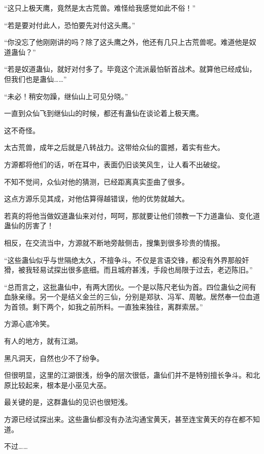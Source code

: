 
\begin{this_body}



“这只上极天鹰，竟然是太古荒兽。难怪给我感觉如此不俗！”

“若是要对付此人，恐怕要先对付这头鹰。”

“你没忘了他刚刚讲的吗？除了这头鹰之外，他还有几只上古荒兽呢。难道他是奴道蛊仙？”

“若是奴道蛊仙，就好对付多了。毕竟这个流派最怕斩首战术。就算他已经成仙，但我们也是蛊仙……”

“未必！稍安勿躁，继仙山上可见分晓。”

一直到众仙飞到继仙山的时候，都还有蛊仙在谈论着上极天鹰。

这不奇怪。

太古荒兽，成年之后就是八转战力。这带给众仙的震撼，着实有些大。

方源都将他们的话，听在耳中，表面仍旧谈笑风生，让人看不出破绽。

不知不觉间，众仙对他的猜测，已经距离真实歪曲了很多。

这点方源乐见其成，对他估算得越错误，他的优势就越大。

若真的将他当做奴道蛊仙来对付，呵呵，那就要让他们领教一下力道蛊仙、变化道蛊仙的厉害了！

相反，在交流当中，方源就不断地旁敲侧击，搜集到很多珍贵的情报。

“这些蛊仙似乎与世隔绝太久，不擅争斗。不仅是言语交锋，都没有外界那般奸猾，被我轻易试探出很多底细。而且城府甚浅，手段也局限于过去，老迈陈旧。”

“总而言之，这批蛊仙中，有两大团伙。一个是以陈尺老仙为首。四位蛊仙之间有血脉亲缘。另一个是结义金兰的三仙，分别是郑驮、冯军、周敏。居然奉一位血道为首领。剩下两个，如我之前所料。一直独来独往，离群索居。”

方源心底冷笑。

有人的地方，就有江湖。

黑凡洞天，自然也少不了纷争。

但很明显，这里的江湖很浅，纷争的层次很低，蛊仙们并不是特别擅长争斗。和北原比较起来，根本是小巫见大巫。

最关键的是，这群蛊仙的见识也很短浅。

方源已经试探出来。这些蛊仙都没有办法沟通宝黄天，甚至连宝黄天的存在都不知道。

不过……


\end{this_body}
